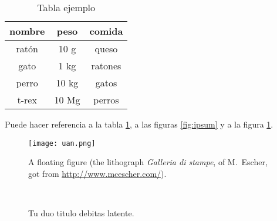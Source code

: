 \begin{table}[tb]
    \caption{Tabla ejemplo}
    \label{tab:ejemplo}
    \centering
    \begin{tabular}{ccc}
        \toprule
        nombre & peso  & comida  \\
        \midrule
        ratón  & 10 g  & queso   \\
        gato   & 1 kg  & ratones \\
        perro  & 10 kg & gatos   \\
        t-rex  & 10 Mg & perros  \\
        \bottomrule
    \end{tabular}
\end{table}

Puede hacer referencia a la tabla \ref{tab:ejemplo}, a las figuras \ref{fig:ipsum} y a la figura \ref{fig:uan}.

\begin{figure}[tb]
    \centering
    \texttt{[image: uan.png]}
    \caption[A floating figure]{A floating figure (the lithograph \emph{Galleria di stampe}, of M.~Escher, got from \url{http://www.mcescher.com/}).}
    \label{fig:uan}
\end{figure}

\begin{figure}[tb]
    \centering

     \quad
     \\
     \quad
    \caption[Tu duo titulo debitas latente]{Tu duo titulo debitas
        latente.}
    \label{fig:esempio}
\end{figure}

